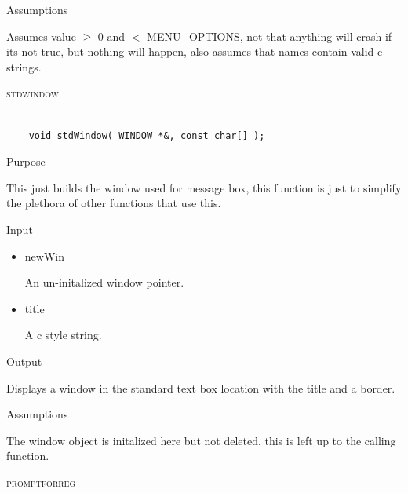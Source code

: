 \documentclass[pdftex, 11pt]{article}
\begin{document}
\begin{description}
\begin{description}
			\item{Assumptions}

				Assumes value $\geq$ 0 and $<$ MENU\_OPTIONS, not that anything
				will crash if its not true, but nothing will happen, also
				assumes that names contain valid c strings.

		\end{description}



	\item{\textsc{stdwindow}}

		\begin{lstlisting}

	void stdWindow( WINDOW *&, const char[] );
		\end{lstlisting}

		\begin{description}
			\item{Purpose}

				This just builds the window used for message box, this function is just to
				simplify the plethora of other functions that use this.
				
			\item{Input}
				
				\begin{itemize}

					\item{newWin}

						An un-initalized window pointer.

					\item{title[]}

						A c style string.

				\end{itemize}

			\item{Output}

				Displays a window in the standard text box location with
				the title and a border.

			\item{Assumptions}

				The window object is initalized here but not deleted, this
				is left up to the calling function.

		\end{description}



	\item{\textsc{promptforreg}}

		\begin{lstlisting}


\end{lstlisting}
\end{description}
\end{document}
